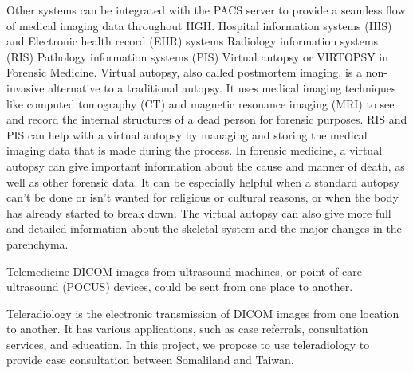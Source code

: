 \documentclass{article}
\begin{document}
\begin{outline}
        \2 Other systems can be integrated with the PACS server to provide a seamless flow of medical imaging data throughout HGH.
        \3 Hospital information systems (HIS) and Electronic health record (EHR) systems
        \3 Radiology information systems (RIS)
        \3 Pathology information systems (PIS)
        \3 Virtual autopsy or VIRTOPSY in Forensic Medicine. Virtual autopsy, also called postmortem imaging, is a non-invasive alternative to a traditional autopsy. It uses medical imaging techniques like computed tomography (CT) and magnetic resonance imaging (MRI) to see and record the internal structures of a dead person for forensic purposes. RIS and PIS can help with a virtual autopsy by managing and storing the medical imaging data that is made during the process. In forensic medicine, a virtual autopsy can give important information about the cause and manner of death, as well as other forensic data. It can be especially helpful when a standard autopsy can't be done or isn't wanted for religious or cultural reasons, or when the body has already started to break down. The virtual autopsy can also give more full and detailed information about the skeletal system and the major changes in the parenchyma.


        
\1 Telemedicine
    \2 DICOM images from ultrasound machines, or point-of-care ultrasound (POCUS) devices, could be sent from one place to another.
    
    \2 Teleradiology is the electronic transmission of DICOM images from one location to another. It has various applications, such as case referrals, consultation services, and education. In this project, we propose to use teleradiology to provide case consultation between Somaliland and Taiwan.


\end{outline}
\end{document}
